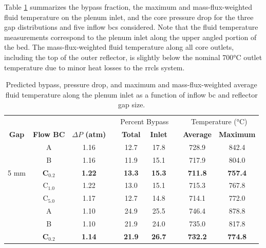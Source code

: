 Table \ref{table:drag3} summarizes the bypass fraction, the maximum and mass-flux-weighted fluid temperature on the plenum inlet, and the core pressure drop for the three gap distributions and five inflow \glspl{bc} considered. Note that the fluid temperature measurements correspond to the plenum inlet along the upper angled portion of the bed. The mass-flux-weighted fluid temperature along all core outlets, including the top of the outer reflector, is slightly below the nominal 700\si{\celsius} outlet temperature due to minor heat losses to the \gls{rrcls} system.

\begin{table}[htb!]
\centering
\begin{threeparttable}
\caption{Predicted bypass, pressure drop, and maximum and mass-flux-weighted average fluid temperature along the plenum inlet as a function of inflow \gls{bc} and reflector gap size\hspace{0.01cm}.}
\label{table:drag3}
\begin{tabular}{@{}c c c c c c c c c @{}}
\toprule
& & & \phantom{a} & \multicolumn{2}{c}{Percent Bypass} &\phantom{a}& \multicolumn{2}{c}{Temperature (\si{\celsius})}\\
\cmidrule{5-6} \cmidrule{8-9}
\textbf{Gap} & \textbf{Flow BC}  & \textbf{{\boldmath$\Delta P$} (atm)} && \textbf{Total} & \textbf{Inlet} && \textbf{Average} & \textbf{Maximum}\\ %
\midrule
\multirow{5}{*}{5 \si{\milli\meter}} & A & 1.16 && 12.7 & 17.8 && 728.9 & 842.4\\ %
& B & 1.16 && 11.9 & 15.1 && 717.9 & 804.0\\ %
& \textbf{C$_{0.2}$} & \textbf{1.22} && \textbf{13.3} & \textbf{15.3} && \textbf{711.8} & \textbf{757.4}\\ %
& C$_{1.0}$ & 1.22 && 13.0 & 15.1 && 715.3 & 767.8\\ %
& C$_{5.0}$ & 1.17 && 12.7 & 14.8 && 714.1 & 772.0\\ %
\rule{0pt}{4ex} 
\multirow{5}{*}{10 \si{\milli\meter}} & A & 1.10 && 24.9 & 25.5 && 746.4 & 878.8\\ %
& B & 1.10 && 21.9 & 24.0 && 735.0 & 817.8\\ %
& \textbf{C$_{0.2}$} & \textbf{1.14} && \textbf{21.9} & \textbf{26.7} && \textbf{732.2} & \textbf{774.8}\\ %

\end{tabular}
\end{threeparttable}
\end{table}

